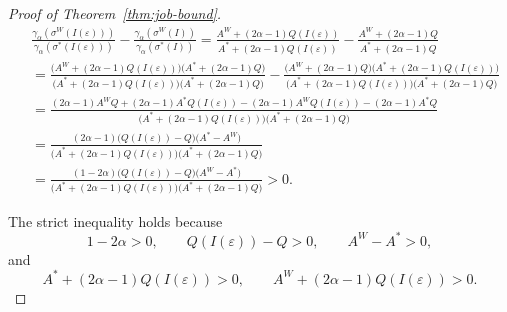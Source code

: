 \documentclass[%
english, titlepage=false %
]{./tum-templates/book/tumbook}
\begin{document}
\label{app:proof-JobNumber}
\begin{proof}[\hypertarget{proof:JobNumber}{Proof of Theorem~\ref{thm:job-bound}}]
\begin{equation} \label{app:ratio-calculation}
\begin{aligned}
&
\frac{\gamma_{\alpha}(\sigma^W(I(\varepsilon)))}{\gamma_{\alpha}(\sigma^{*}(I(\varepsilon)))}-
\frac{\gamma_{\alpha}(\sigma^W(I))}{\gamma_{\alpha}(\sigma^{*}(I))}
=
\frac{A^W+(2\alpha-1)Q(I(\varepsilon))}
     {A^*+(2\alpha-1)Q(I(\varepsilon))}
-
\frac{A^W+(2\alpha-1)Q}
     {A^*+(2\alpha-1)Q}
\\[1mm]
&=
\frac{
\bigl(A^W+(2\alpha-1)Q(I(\varepsilon))\bigr)
\bigl(A^*+(2\alpha-1)Q\bigr)}
{\bigl(A^*+(2\alpha-1)Q(I(\varepsilon))\bigr)
 \bigl(A^*+(2\alpha-1)Q\bigr)}
-
\frac{
\bigl(A^W+(2\alpha-1)Q\bigr)
\bigl(A^*+(2\alpha-1)Q(I(\varepsilon))\bigr)}
{\bigl(A^*+(2\alpha-1)Q(I(\varepsilon))\bigr)
 \bigl(A^*+(2\alpha-1)Q\bigr)}
\\[1mm]
&=
\frac{
(2\alpha-1)A^WQ
+(2\alpha-1)A^* Q(I(\varepsilon))
-(2\alpha-1)A^W Q(I(\varepsilon))
-(2\alpha-1)A^*Q}
{\bigl(A^* +(2\alpha-1)Q(I(\varepsilon))\bigr)
 \bigl(A^* +(2\alpha-1)Q\bigr)}
\\[1mm]
&=
\frac{
(2\alpha-1)
\bigl(Q(I(\varepsilon))-Q\bigr)
\bigl(A^* - A^W\bigr)}
{\bigl(A^* +(2\alpha-1)Q(I(\varepsilon))\bigr)
 \bigl(A^* +(2\alpha-1)Q\bigr)}
\\[1mm]
&=
\frac{
(1-2\alpha)
\bigl(Q(I(\varepsilon))-Q\bigr)
\bigl(A^W-A^*\bigr)}
{\bigl(A^*+(2\alpha-1)Q(I(\varepsilon))\bigr)
 \bigl(A^*+(2\alpha-1)Q\bigr)} > 0.
\end{aligned}
\end{equation}

The strict inequality holds because
\[
1-2\alpha>0,\qquad
Q(I(\varepsilon))-Q>0,\qquad
A^W-A^*>0,
\]
and
\[
A^*+(2\alpha-1)Q(I(\varepsilon))>0,
\qquad
A^W+(2\alpha-1)Q(I(\varepsilon))>0.
\]
\end{proof}
\end{document}
